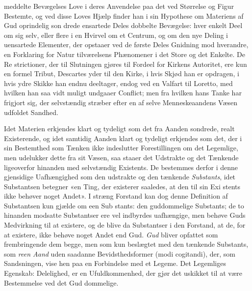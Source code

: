 \documentclass[12pt,a4paper]{book}
\begin{document}
meddelte Bevægelses Love i deres Anvendelse paa det ved
Størrelse og Figur Bestemte, og ved disse Loves Hjælp finder
han i sin Hypothese om Materiens af Gud oprindelig son\-%
drede ensartede Deles dobbelte Bevægelse: hver enkelt Deel
om sig selv, eller flere i en Hvirvel om et Centrum, og om
den nye Deling i uensartede Elementer, der opstaaer ved de
første Deles Gnidning mod hverandre, en Forklaring for Natur\-%
tilværelsens Phænomener i det Store og det Enkelte. De Re\-%
strictioner, der til Slutningen gjøres til Fordeel for Kirkens
Autoritet, ere kun en formel Tribut, Descartes yder til den
Kirke, i hvis Skjød han er opdragen, i hvis ydre Skikke han
endnu deeltager, endog ved en Valfart til Loretto, med hvilken
han saa vidt muligt undgaaer Conflict; men fra hvilken hans
Tanke har frigjort sig, der selvstændig stræber efter en af
selve Menneskeaandens Væsen udfoldet Sandhed.

Idet Materien erkjendes klart og tydeligt som det fra
Aanden sondrede, realt Existerende, og idet samtidig Aanden
klart og tydeligt erkjendes som det, der i sin Bestemthed som
Tænken ikke indeslutter Forestillingen om det Legemlige, men
udelukker dette fra sit Væsen, saa staaer det Udstrakte og
det Tænkende ligeoverfor hinanden med selvstændig Existents.
De bestemmes derfor i denne gjensidige Uafhængighed som
den udstrakte og den tænkende \emph{Substants}, idet Substantsen
betegner «en Ting, der existerer saaledes, at den til sin Exi\-%
stents ikke behøver noget Andet». I stræng Forstand kan
dog denne Definition af Substantsen kun gjælde om een Sub\-%
stants: den guddommelige Substants; de to hinanden modsatte
Substantser ere vel indbyrdes uafhængige, men behøve Guds
Medvirkning til at existere, og de blive da Substantser i den
Forstand, at de, for at existere, ikke behøve noget Andet end
Gud. \emph{Gud} bliver opfattet som frembringende dem begge, men
som kun beslægtet med den tænkende Substants, som \emph{reen
Aand} uden saadanne Bevidsthedsformer (modi cogitandi), der,
som Sandsningen, vise hen paa en Forbindelse med et Legeme.
Det Legemliges Egenskab: Delelighed, er en Ufuldkommenhed,
der gjør det uskikket til at være Bestemmelse ved det Gud\-%
dommelige.
\end{document}

